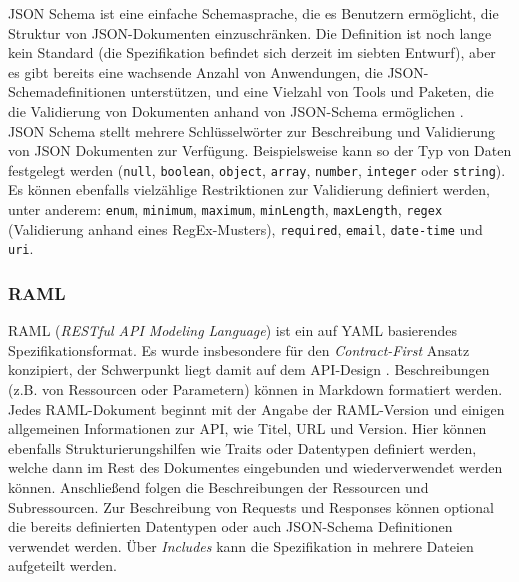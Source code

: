 JSON Schema ist eine einfache Schemasprache, die es Benutzern ermöglicht, die Struktur von JSON-Dokumenten einzuschränken. Die Definition ist noch lange kein Standard (die Spezifikation befindet sich derzeit im siebten Entwurf), aber es gibt bereits eine wachsende Anzahl von Anwendungen, die JSON-Schemadefinitionen unterstützen, und eine Vielzahl von Tools und Paketen, die die Validierung von Dokumenten anhand von JSON-Schema ermöglichen \parencite[264]{pezoa2016foundations}. \\

JSON Schema stellt mehrere Schlüsselwörter zur Beschreibung und Validierung von JSON Dokumenten zur Verfügung. Beispielsweise kann so der Typ von Daten festgelegt werden (\lstinline|null|, \lstinline|boolean|, \lstinline|object|, \lstinline|array|, \lstinline|number|, \lstinline|integer| oder \lstinline|string|). Es können ebenfalls vielzählige Restriktionen zur Validierung definiert werden, unter anderem: \lstinline|enum|, \lstinline|minimum|, \lstinline|maximum|, \lstinline|minLength|, \lstinline|maxLength|, \lstinline|regex| (Validierung anhand eines RegEx-Musters), \lstinline|required|, \lstinline|email|, \lstinline|date-time| und \lstinline|uri|.

\subsubsection{RAML}
RAML (\emph{RESTful API Modeling Language}) ist ein auf YAML basierendes Spezifikationsformat. Es wurde insbesondere für den \emph{Contract-First} Ansatz konzipiert, der Schwerpunkt liegt damit auf dem API-Design \parencites[277]{spichale2017api}[165]{tilkov2015rest}. Beschreibungen (z.B. von Ressourcen oder Parametern) können in Markdown formatiert werden. \\

Jedes RAML-Dokument beginnt mit der Angabe der RAML-Version und einigen allgemeinen Informationen zur API, wie Titel, URL und Version. Hier können ebenfalls Strukturierungshilfen wie Traits oder Datentypen definiert werden, welche dann im Rest des Dokumentes eingebunden und wiederverwendet werden können. Anschließend folgen die Beschreibungen der Ressourcen und Subressourcen. Zur Beschreibung von Requests und Responses können optional die bereits definierten Datentypen oder auch JSON-Schema Definitionen verwendet werden. Über \emph{Includes} kann die Spezifikation in mehrere Dateien aufgeteilt werden.